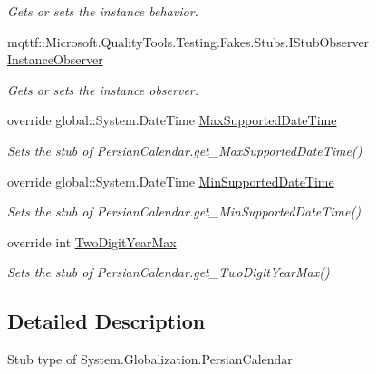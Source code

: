 \begin{DoxyCompactItemize}
\begin{DoxyCompactList}\small\item\em Gets or sets the instance behavior.\end{DoxyCompactList}\item 
mqttf\-::\-Microsoft.\-Quality\-Tools.\-Testing.\-Fakes.\-Stubs.\-I\-Stub\-Observer \hyperlink{class_system_1_1_globalization_1_1_fakes_1_1_stub_persian_calendar_ae9d8c5e221a6f97d031deffe4d14b72a}{Instance\-Observer}
\begin{DoxyCompactList}\small\item\em Gets or sets the instance observer.\end{DoxyCompactList}\item 
override global\-::\-System.\-Date\-Time \hyperlink{class_system_1_1_globalization_1_1_fakes_1_1_stub_persian_calendar_a254f090e3e0308abf86b556dd2f4f98f}{Max\-Supported\-Date\-Time}
\begin{DoxyCompactList}\small\item\em Sets the stub of Persian\-Calendar.\-get\-\_\-\-Max\-Supported\-Date\-Time()\end{DoxyCompactList}\item 
override global\-::\-System.\-Date\-Time \hyperlink{class_system_1_1_globalization_1_1_fakes_1_1_stub_persian_calendar_a2e4117c4c0aef06c7517984b1477e3f3}{Min\-Supported\-Date\-Time}
\begin{DoxyCompactList}\small\item\em Sets the stub of Persian\-Calendar.\-get\-\_\-\-Min\-Supported\-Date\-Time()\end{DoxyCompactList}\item 
override int \hyperlink{class_system_1_1_globalization_1_1_fakes_1_1_stub_persian_calendar_a51f7ac1714390c78a9334fda738cef70}{Two\-Digit\-Year\-Max}
\begin{DoxyCompactList}\small\item\em Sets the stub of Persian\-Calendar.\-get\-\_\-\-Two\-Digit\-Year\-Max()\end{DoxyCompactList}\end{DoxyCompactItemize}


\subsection{Detailed Description}
Stub type of System.\-Globalization.\-Persian\-Calendar



